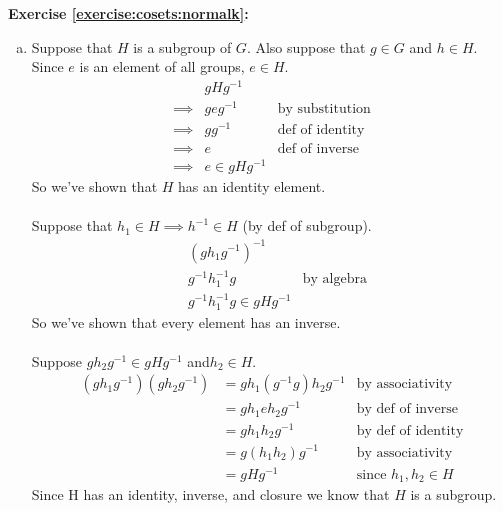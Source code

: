 \noindent\textbf{Exercise \ref{exercise:cosets:normalk}:}
\begin{enumerate}[(a)]
\item
Suppose that $H$ is a subgroup of $G$.  Also suppose that $g \in G$ and $h \in H$.
\\
Since $e$ is an element of all groups, $e \in H$.
\begin{align*}
&gHg^{-1}
\\
\implies &geg^{-1} &\text{by substitution}
\\
\implies &gg^{-1} &\text{def of identity}
\\
\implies &e &\text{def of inverse}
\\
\implies &e \in gHg^{-1}
\end{align*}
So we've shown that $H$ has an identity element.
\\
\\
Suppose that $h_1 \in H \implies h^{-1} \in H$ (by def of subgroup).
\begin{align*}
&(gh_1g^{-1})^{-1}
\\
&g^{-1}h_1^{-1}g &\text{by algebra}
\\
&g^{-1}h_1^{-1}g \in gHg^{-1} 
\end{align*}
So we've shown that every element has an inverse.
\\
\\
Suppose $gh_2g^{-1} \in gHg^{-1}$ and$h_2 \in H$.
\begin{align*}
(gh_1g^{-1})(gh_2g^{-1}) &= gh_1(g^{-1}g)h_2g^{-1} &\text{by associativity}
\\
&= gh_1eh_2g^{-1} &\text{by def of inverse}
\\
&= gh_1h_2g^{-1} &\text{by def of identity}
\\
&= g(h_1h_2)g^{-1} &\text{by associativity}
\\
&= gHg^{-1} &\text{since\ } h_1, h_2 \in H
\end{align*}
Since H has an identity, inverse, and closure we know that $H$ is a subgroup.
 

\end{enumerate}
